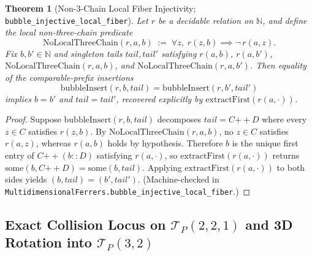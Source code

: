 \documentclass[11pt]{article}
\newtheorem{theorem}{Theorem}[section]
\theoremstyle{definition}
\newcommand{\TP}{\mathcal{T}_P}
\newcommand{\N}{\mathbb{N}}
\begin{document}
\begin{theorem}[Non-3-Chain Local Fiber Injectivity; \nolinkurl{bubble_injective_local_fiber}]
\label{thm:local-fiber}
Let $r$ be a decidable relation on $\N$, and define the local non-three-chain predicate
\[
  \mathrm{NoLocalThreeChain}(r, a, b) \;:=\; \forall z,\; r(z, b) \implies \neg\, r(a, z).
\]
Fix $b,b'\in\N$ and singleton tails $\mathit{tail}, \mathit{tail}'$ satisfying $r(a, b)$, $r(a, b')$, $\mathrm{NoLocalThreeChain}(r, a, b)$, and $\mathrm{NoLocalThreeChain}(r, a, b')$. Then equality of the comparable-prefix insertions
\[
  \mathrm{bubbleInsert}(r, b, \mathit{tail}) = \mathrm{bubbleInsert}(r, b', \mathit{tail}')
\]
implies $b = b'$ and $\mathit{tail} = \mathit{tail}'$, recovered explicitly by $\mathrm{extractFirst}(r(a, \cdot))$.
\end{theorem}
\begin{proof}
Suppose $\mathrm{bubbleInsert}(r, b, \mathit{tail})$ decomposes $\mathit{tail} = C \mathbin{++} D$ where every $z \in C$ satisfies $r(z, b)$. By $\mathrm{NoLocalThreeChain}(r, a, b)$, no $z \in C$ satisfies $r(a, z)$, whereas $r(a, b)$ holds by hypothesis. Therefore $b$ is the unique first entry of $C \mathbin{++} (b :: D)$ satisfying $r(a, \cdot)$, so $\mathrm{extractFirst}(r(a, \cdot))$ returns $\mathrm{some}(b, C \mathbin{++} D) = \mathrm{some}(b, \mathit{tail})$. Applying $\mathrm{extractFirst}(r(a, \cdot))$ to both sides yields $(b, \mathit{tail}) = (b', \mathit{tail}')$. (Machine-checked in \nolinkurl{MultidimensionalFerrers.bubble_injective_local_fiber}.)
\end{proof}

\subsection{Exact Collision Locus on $\TP(2,2,1)$ and 3D Rotation into $\TP(3,2)$}
\end{document}
